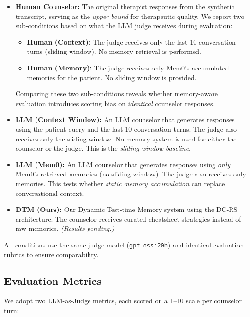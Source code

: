 \begin{itemize}
    \item \textbf{Human Counselor:} The original therapist responses from the synthetic transcript, serving as the \emph{upper bound} for therapeutic quality. We report two sub-conditions based on what the LLM judge receives during evaluation:
    \begin{itemize}
        \item \textbf{Human (Context):} The judge receives only the last 10 conversation turns (sliding window). No memory retrieval is performed.
        \item \textbf{Human (Memory):} The judge receives only Mem0's accumulated memories for the patient. No sliding window is provided.
    \end{itemize}
    Comparing these two sub-conditions reveals whether memory-aware evaluation introduces scoring bias on \emph{identical} counselor responses.
    \item \textbf{LLM (Context Window):} An LLM counselor that generates responses using the patient query and the last 10 conversation turns. The judge also receives only the sliding window. No memory system is used for either the counselor or the judge. This is the \emph{sliding window baseline}.
    \item \textbf{LLM (Mem0):} An LLM counselor that generates responses using \emph{only} Mem0's retrieved memories (no sliding window). The judge also receives only memories. This tests whether \emph{static memory accumulation} can replace conversational context.
    \item \textbf{DTM (Ours):} Our Dynamic Test-time Memory system using the DC-RS architecture. The counselor receives curated cheatsheet strategies instead of raw memories. \textit{(Results pending.)}
\end{itemize}

All conditions use the same judge model (\texttt{gpt-oss:20b}) and identical evaluation rubrics to ensure comparability.

\subsection{Evaluation Metrics}

We adopt two LLM-as-Judge metrics, each scored on a 1--10 scale per counselor turn:

